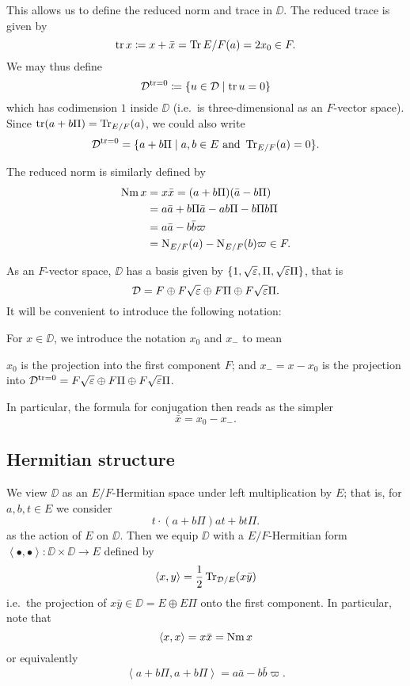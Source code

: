 This allows us to define the reduced norm and trace in $\DD$.
The reduced trace is given by
\[ \operatorname{tr} x \coloneqq x + \bar x = \operatorname{Tr}{E/F}(a) = 2x_0 \in F. \]
We may thus define
\[ \mathcal D^{\operatorname{tr} = 0} \coloneqq \left\{ u \in \mathcal D \mid \operatorname{tr} u = 0 \right\} \]
which has codimension $1$ inside $\DD$ (i.e.\ is three-dimensional as an $F$-vector space).
Since $\operatorname{tr}(a+b\Pi) = \operatorname{Tr}_{E/F}(a)$, we could also write
\[ \mathcal D^{\operatorname{tr} = 0} = \{ a+b\Pi \mid a,b \in E \text{ and } \operatorname{Tr}_{E/F}(a) = 0 \}. \]

The reduced norm is similarly defined by
\begin{align*}
  \operatorname{Nm} x &= x \bar x = (a + b \Pi)(\bar a - b \Pi) \\
  &= a \bar a + b \Pi \bar a - a b \Pi - b \Pi b \Pi \\
  &= a \bar a - b \bar b \varpi \\
  &= \operatorname{N}_{E/F}(a) - \operatorname{N}_{E/F}(b) \varpi \in F.
\end{align*}

As an $F$-vector space, $\DD$ has a basis given by
$\{1, \sqrt{\varepsilon}, \Pi, \sqrt{\varepsilon}\Pi\}$, that is
\[ \mathcal D = F \oplus F\sqrt{\varepsilon} \oplus F \Pi \oplus F\sqrt{\varepsilon}\Pi. \]
It will be convenient to introduce the following notation:
\begin{definition}
  For $x \in \DD$, we introduce the notation $x_0$ and $x_-$ to mean
  \begin{itemize}
    \ii $x_0$ is the projection into the first component $F$; and
    \ii $x_- = x - x_0$ is the projection into
    $\mathcal D^{\operatorname{tr} = 0} = F\sqrt{\varepsilon} \oplus F \Pi \oplus F\sqrt{\varepsilon}\Pi$.
  \end{itemize}
\end{definition}
In particular, the formula for conjugation then reads as the simpler
\[ \bar x = x_0 - x_-. \]

\subsection{Hermitian structure}
We view $\DD$ as an $E/F$-Hermitian space under left multiplication by $E$;
that is, for $a,b,t \in E$ we consider
\[ t \cdot (a + b \Pi) a t + b t \Pi. \]
as the action of $E$ on $\DD$.
Then we equip $\DD$ with a $E/F$-Hermitian form
$\left\langle \bullet, \bullet \right\rangle \colon \DD \times \DD \to E$
defined by
\[ \left\langle x,y \right\rangle = \frac{1}{2} \operatorname{Tr}_{\mathcal D/E}(x \bar y) \]
i.e.\ the projection of $x \bar y \in \DD = E \oplus E\Pi$ onto the first component.
In particular, note that
\[ \left\langle x,x \right\rangle = x \bar{x} = \operatorname{Nm} x \]
or equivalently
\[ \left\langle a+b\Pi, a+b\Pi \right\rangle = a \bar a - b \bar b \varpi. \]

